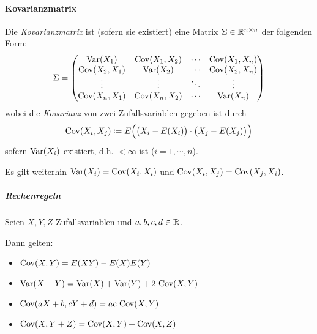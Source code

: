         \paragraph{Kovarianzmatrix}
            Die \textit{Kovarianzmatrix} ist (sofern sie existiert) eine Matrix \( \Sigma \in \mathbb{R}^{n \times n} \) der folgenden Form:
            \begin{equation*}
	            \Sigma =
	            \begin{pmatrix}
	            	\operatorname{Var}(X_1)      & \operatorname{Cov}(X_1, X_2) & \cdots & \operatorname{Cov}(X_1, X_n) \\
	            	\operatorname{Cov}(X_2, X_1) & \operatorname{Var}(X_2)      & \cdots & \operatorname{Cov}(X_2, X_n) \\
	            	\vdots         & \vdots         & \ddots & \vdots         \\
	            	\operatorname{Cov}(X_n, X_1) & \operatorname{Cov}(X_n, X_2) & \cdots & \operatorname{Var}(X_n)
	            \end{pmatrix}
            \end{equation*}
            wobei die \textit{Kovarianz} von zwei Zufallsvariablen gegeben ist durch \[ \operatorname{Cov}(X_i, X_j) \coloneqq E\Big( \big(X_i - E(X_i)\big) \cdot \big(X_j - E(X_j)\big) \Big) \] sofern \( \operatorname{Var}(X_i) \) existiert, d.h. \( < \infty \) ist (\( i = 1, \cdots, n \)).
            
            Es gilt weiterhin \( \operatorname{Var}(X_i) = \operatorname{Cov}(X_i, X_i) \) und \( \operatorname{Cov}(X_i, X_j) = \operatorname{Cov}(X_j, X_i) \).
            
            \subparagraph{Rechenregeln}
	            Seien \(X, Y, Z\) Zufallsvariablen und \( a, b, c, d \in \mathbb{R} \).
	            
	            Dann gelten:
	            \begin{itemize}
	            	\item \( \operatorname{Cov}(X, Y) = E(XY) - E(X) E(Y) \)
	            	\item \( \operatorname{Var}(X - Y) = \operatorname{Var}(X) + \operatorname{Var}(Y) + 2 \, \operatorname{Cov}(X, Y) \)
	            	\item \( \operatorname{Cov}(aX + b, cY + d) = ac \, \operatorname{Cov}(X, Y) \)
	            	\item \( \operatorname{Cov}(X, Y + Z) = \operatorname{Cov}(X, Y) + \operatorname{Cov}(X, Z) \)
	            \end{itemize}
            
